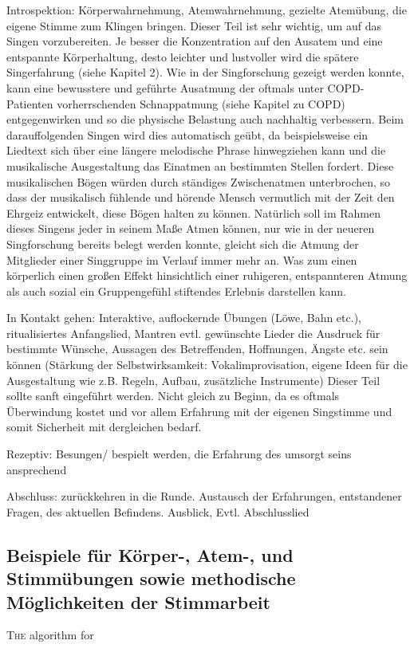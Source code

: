Introspektion: 
Körperwahrnehmung, Atemwahrnehmung, gezielte Atemübung, die eigene Stimme zum Klingen bringen. Dieser Teil ist sehr wichtig, um auf das Singen vorzubereiten. Je besser die Konzentration auf den Ausatem und eine entspannte Körperhaltung, desto leichter und lustvoller wird die spätere Singerfahrung (siehe Kapitel 2). Wie in der Singforschung gezeigt werden konnte, kann eine bewusstere und geführte Ausatmung der oftmals unter COPD-Patienten vorherrschenden Schnappatmung (siehe Kapitel zu COPD) entgegenwirken und so die physische Belastung auch nachhaltig verbessern. Beim darauffolgenden Singen wird dies automatisch geübt, da beispielsweise ein Liedtext sich über eine längere melodische Phrase hinwegziehen kann und die musikalische Ausgestaltung das Einatmen an bestimmten Stellen fordert. Diese musikalischen Bögen würden durch ständiges Zwischenatmen unterbrochen, so dass der musikalisch fühlende und hörende Mensch vermutlich mit der Zeit den Ehrgeiz entwickelt, diese Bögen halten zu können. Natürlich soll im Rahmen dieses Singens jeder in seinem Maße Atmen können, nur wie in der neueren Singforschung bereits belegt werden konnte, gleicht sich die Atmung der Mitglieder einer Singgruppe im Verlauf immer mehr an. Was zum einen körperlich einen großen Effekt hinsichtlich einer ruhigeren, entspannteren Atmung als auch sozial ein Gruppengefühl stiftendes Erlebnis darstellen kann.

In Kontakt gehen: 
Interaktive, auflockernde Übungen (Löwe, Bahn etc.), ritualisiertes Anfangslied, Mantren evtl. gewünschte Lieder die Ausdruck für bestimmte Wünsche, Aussagen des Betreffenden, Hoffnungen, Ängste etc. sein können
(Stärkung der Selbstwirksamkeit: Vokalimprovisation, eigene Ideen für die Ausgestaltung wie z.B. Regeln, Aufbau, zusätzliche Instrumente) Dieser Teil sollte sanft eingeführt werden. Nicht gleich zu Beginn, da es oftmals Überwindung kostet und vor allem Erfahrung mit der eigenen Singstimme und somit Sicherheit mit dergleichen bedarf.

Rezeptiv: 
Besungen/ bespielt werden, die Erfahrung des umsorgt seins ansprechend

Abschluss: 
zurückkehren in die Runde. Austausch der Erfahrungen, entstandener Fragen, des aktuellen Befindens. Ausblick, Evtl. Abschlusslied


\subsection{Beispiele für Körper-, Atem-, und Stimmübungen sowie methodische Möglichkeiten der Stimmarbeit}



\ifpdf
    \graphicspath{{5_konzept/figures/PNG/}{5_konzept/figures/PDF/}{5_konzept/figures/}}
\else
    \graphicspath{{5_konzept/figures/EPS/}{5_konzept/figures/}}
\fi

\lettrine{T}{he} algorithm for

\newpage\thispagestyle{empty}
